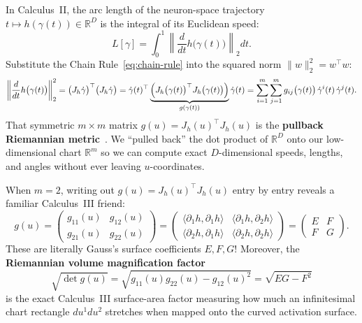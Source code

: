 \documentclass[11pt,a4paper]{article}
\newcommand{\R}{\mathbb{R}}
\theoremstyle{definition}
\begin{document}
In Calculus~II, the arc length of the neuron-space trajectory $t \mapsto h(\gamma(t)) \in \R^D$ is the integral of its Euclidean speed:
\[
    L[\gamma] = \int_0^1 \left\| \frac{d}{dt} h\bigl(\gamma(t)\bigr) \right\|_2 dt.
\]
Substitute the Chain Rule~\eqref{eq:chain-rule} into the squared norm $\|w\|_2^2 = w^\top w$:
\begin{equation}
    \left\| \frac{d}{dt} h\bigl(\gamma(t)\bigr) \right\|_2^2
    = \bigl(J_h \dot{\gamma}\bigr)^\top \bigl(J_h \dot{\gamma}\bigr)
    = \dot{\gamma}(t)^\top \underbrace{\Bigl(J_h\bigl(\gamma(t)\bigr)^\top J_h\bigl(\gamma(t)\bigr)\Bigr)}_{g(\gamma(t))} \dot{\gamma}(t)
    = \sum_{i=1}^m \sum_{j=1}^m g_{ij}\bigl(\gamma(t)\bigr)\,\dot{\gamma}^i(t)\,\dot{\gamma}^j(t).
    \label{eq:pullback-derivation}
\end{equation}
That symmetric $m \times m$ matrix $g(u) = J_h(u)^\top J_h(u)$ is the \textbf{pullback Riemannian metric}~\cite{morgan2016riemannian,guigui2023geomstats}. We ``pulled back'' the dot product of $\R^D$ onto our low-dimensional chart $\R^m$ so we can compute exact $D$-dimensional speeds, lengths, and angles without ever leaving $u$-coordinates.

\begin{keyidea}
When $m = 2$, writing out $g(u) = J_h(u)^\top J_h(u)$ entry by entry reveals a familiar Calculus~III friend:
\[
    g(u) = \begin{pmatrix} g_{11}(u) & g_{12}(u) \\ g_{21}(u) & g_{22}(u) \end{pmatrix}
    = \begin{pmatrix} \langle \partial_1 h, \partial_1 h \rangle & \langle \partial_1 h, \partial_2 h \rangle \\ \langle \partial_2 h, \partial_1 h \rangle & \langle \partial_2 h, \partial_2 h \rangle \end{pmatrix}
    = \begin{pmatrix} E & F \\ F & G \end{pmatrix}.
\]
These are literally Gauss's surface coefficients $E, F, G$! Moreover, the \textbf{Riemannian volume magnification factor}
\begin{equation}
    \sqrt{\det g(u)} = \sqrt{g_{11}(u)g_{22}(u) - g_{12}(u)^2} = \sqrt{EG - F^2}
    \label{eq:volume-factor}
\end{equation}
is the exact Calculus~III surface-area factor measuring how much an infinitesimal chart rectangle $du^1 du^2$ stretches when mapped onto the curved activation surface.
\end{keyidea}
\end{document}
